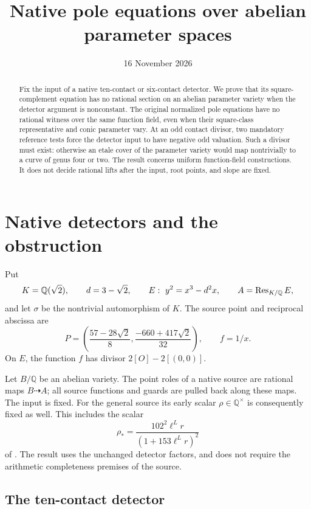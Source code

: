 \documentclass[11pt,a4paper]{article}
\title{Native pole equations over abelian parameter spaces}
\author{}\date{16 November 2026}
\theoremstyle{remark}\newtheorem{remark}[theorem]{Remark}
\newcommand{\Q}{\mathbb Q}\newcommand{\Qbar}{\overline{\mathbb Q}}
\begin{document}
\maketitle
\begin{abstract}
Fix the input of a native ten-contact or six-contact detector. We prove
that its square-complement equation has no rational section on an
abelian parameter variety when the detector argument is nonconstant.
The original normalized pole equations have no rational witness over
the same function field, even when their square-class representative
and conic parameter vary. At an odd contact divisor, two mandatory
reference tests force the detector input to have negative odd valuation.
Such a divisor must exist: otherwise an etale cover of the parameter
variety would map nontrivially to a curve of genus four or two.
The result concerns uniform function-field constructions. It does not
decide rational lifts after the input, root points, and slope are fixed.
\end{abstract}

\section{Native detectors and the obstruction}

Put
\[
 K=\Q(\sqrt2),\qquad d=3-\sqrt2,\qquad
 E:\ y^2=x^3-d^2x,\qquad A=\Res_{K/\Q}E,
\]
and let $\sigma$ be the nontrivial automorphism of $K$. The source
point and reciprocal abscissa are
\[
 P=\left(\frac{57-28\sqrt2}{8},
          \frac{-660+417\sqrt2}{32}\right),\qquad f=1/x.
\]
On $E$, the function $f$ has divisor $2[O]-2[(0,0)]$.

Let $B/\Q$ be an abelian variety. The point roles of a native source
are rational maps $B\dashrightarrow A$; all source functions and
guards are pulled back along these maps. The input is fixed. For the
general source its early scalar $\rho\in\Q^\times$ is consequently
fixed as well. This includes the scalar
\[
 \rho_*=\frac{102^2\ell^L r}{(1+153\ell^L r)^2}
\]
of \cite{Baseline}. The result uses the unchanged detector factors,
and does not require the arithmetic completeness premises of the source.

\subsection{The ten-contact detector}
\end{document}
